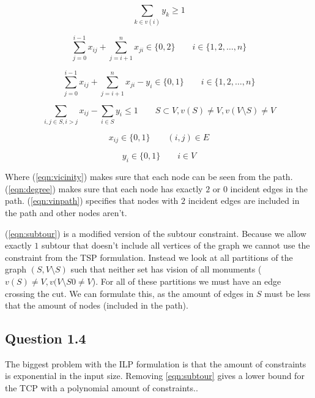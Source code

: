 \documentclass{sig-alternate}
\begin{document}
\begin{equation}
    \label{eqn:vicinity}
    \sum_{k \in v(i)} y_k \geq 1
\end{equation}

\begin{equation}
    \label{eqn:degree}
    \sum_{j=0}^{i-1} x_{ij} + \sum_{j=i+1}^{n} x_{ji} \in \{0,2\}
    \qquad i \in \{1,2,\ldots,n\}
\end{equation}

\begin{equation}
    \label{eqn:vinpath}
    \sum_{j=0}^{i-1} x_{ij} + \sum_{j=i+1}^{n} x_{ji} - y_i \in \{0,1\}
    \qquad i \in \{1,2,\ldots,n\}
\end{equation}

\begin{equation}
    \label{eqn:subtour}
    \sum_{i,j \in S, i > j} x_{ij} - \sum_{i \in S} y_i \le 1
    \qquad S\subset V, v(S) \ne V, v(V\setminus S) \ne V
\end{equation}

\begin{equation}
    x_{ij} \in \{0,1\}
    \qquad (i,j) \in E
\end{equation}

\begin{equation}
    y_{i} \in \{0,1\}
    \qquad i \in V
\end{equation}

Where (\ref{eqn:vicinity}) makes sure that each node can be seen from the path.
(\ref{eqn:degree}) makes sure that each node has exactly $2$ or $0$ incident
edges in the path. (\ref{eqn:vinpath}) specifies that nodes with $2$ incident
edges are included in the path and other nodes aren't.

(\ref{eqn:subtour}) is a modified version of the subtour constraint. Because
we allow exactly $1$ subtour that doesn't include all vertices of the graph
we cannot use the constraint from the TSP formulation. Instead we look at
all partitions of the graph $(S, V\setminus S)$ such that neither set has
vision of all monuments ($v(S)\ne V, v(V\setminus S0\ne V$). For all of these
partitions we must have an edge crossing the cut. We can formulate this, as
the amount of edges in $S$ must be less that the amount of nodes (included in
the path).

\subsection*{Question 1.4}
The biggest problem with the ILP formulation is that the amount of constraints
is exponential in the input size. Removing \autoref{eqn:subtour} gives a lower
bound for the TCP with a polynomial amount of constraints..
\end{document}

